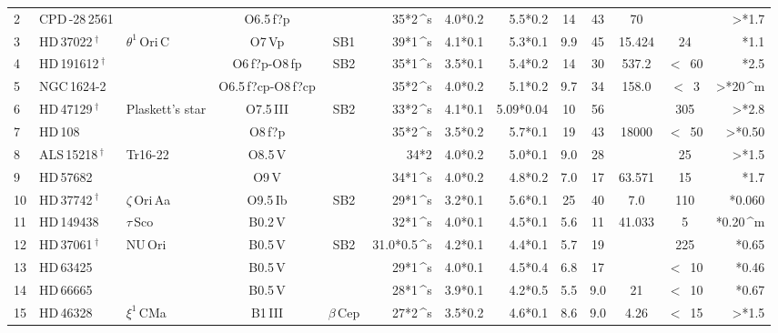 \begin{longtable}{l l l c c D{*}{\,\pm\,}{4,4} D{*}{\,\pm\,}{4,4} D{*}{\,\pm\,}{6,6} c c c c D{*}{\,}{2,4} }
2 & CPD\,-28\,2561 &   & O6.5\,f?p &  &35*2\,^{s} & 4.0*0.2 & 5.5*0.2 & 14 & 43 & 70 &  & >*1.7 \\ 

3 & HD\,37022\,$^\dagger$ & $\theta^1$\,Ori\,C & O7\,Vp & SB1 &39*1\,^{s} & 4.1*0.1 & 5.3*0.1 & 9.9 & 45 & 15.424 & 24 & *1.1 \\ 

4 & HD\,191612\,$^\dagger$ &   & O6\,f?p-O8\,fp & SB2 &35*1\,^{s} & 3.5*0.1 & 5.4*0.2 & 14 & 30 & 537.2 & $<$~60 & *2.5 \\ 

5 & NGC\,1624-2 &   & O6.5\,f?cp-O8\,f?cp &  &35*2\,^{s} & 4.0*0.2 & 5.1*0.2 & 9.7 & 34 & 158.0 & $<$~3 & >*20\,^m \\ 

6 & HD\,47129\,$^\dagger$ & Plaskett's star & O7.5\,III & SB2 &33*2\,^{s} & 4.1*0.1 & 5.09*0.04 & 10 & 56 &   & 305 & >*2.8 \\ 

7 & HD\,108 &   & O8\,f?p &  &35*2\,^{s} & 3.5*0.2 & 5.7*0.1 & 19 & 43 & 18000 & $<$~50 & >*0.50 \\ 

8 & ALS\,15218\,$^\dagger$ & Tr16-22 & O8.5\,V &  &34*2 & 4.0*0.2 & 5.0*0.1 & 9.0 & 28 &   & 25 & >*1.5 \\ 

9 & HD\,57682 &   & O9\,V &  &34*1\,^{s} & 4.0*0.2 & 4.8*0.2 & 7.0 & 17 & 63.571 & 15 & *1.7 \\ 

10 & HD\,37742\,$^\dagger$ & $\zeta$\,Ori\,Aa	 & O9.5\,Ib & SB2 &29*1\,^{s} & 3.2*0.1 & 5.6*0.1 & 25 & 40 & 7.0 & 110 & *0.060 \\ 

11 & HD\,149438 & $\tau$\,Sco & B0.2\,V &  &32*1\,^{s} & 4.0*0.1 & 4.5*0.1 & 5.6 & 11 & 41.033 & 5 & *0.20\,^m \\ 

12 & HD\,37061\,$^\dagger$ & NU\,Ori & B0.5\,V & SB2 &31.0*0.5\,^{s} & 4.2*0.1 & 4.4*0.1 & 5.7 & 19 &   & 225 & *0.65 \\ 

13 & HD\,63425 &   & B0.5\,V &  &29*1\,^{s} & 4.0*0.1 & 4.5*0.4 & 6.8 & 17 &   & $<$~10 & *0.46 \\ 

14 & HD\,66665 &   & B0.5\,V &  &28*1\,^{s} & 3.9*0.1 & 4.2*0.5 & 5.5 & 9.0 & 21 & $<$~10 & *0.67 \\ 

15 & HD\,46328 & $\xi^1$\,CMa	 & B1\,III & $\beta$\,Cep &27*2\,^{s} & 3.5*0.2 & 4.6*0.1 & 8.6 & 9.0 & 4.26 & $<$~15 & >*1.5 \\ 


\end{longtable}
